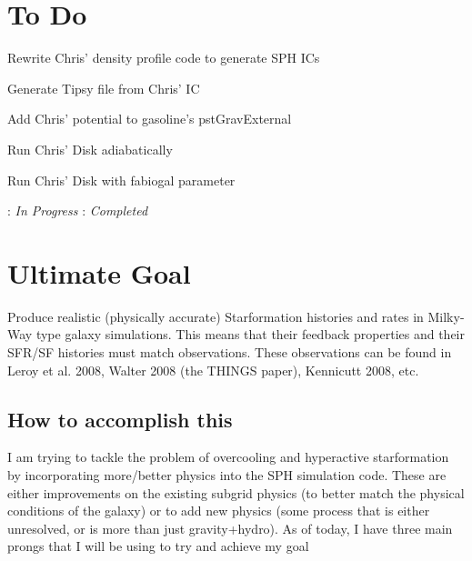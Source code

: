 \documentclass[11pt,letterpaper]{article}
\begin{document}
\section{To Do}
\begin{bullets}
\item[\checkmark] Rewrite Chris' density profile code to generate SPH ICs
\item[\checkmark] Generate Tipsy file from Chris' IC
\item Add Chris' potential to gasoline's pstGravExternal
\item Run Chris' Disk adiabatically
\item Run Chris' Disk with fabiogal parameter
\end{bullets}

\textleaf : \textit{In Progress} \qquad \checkmark : \textit{Completed}
\section{Ultimate Goal}

Produce realistic (physically accurate) Starformation histories and
rates in Milky-Way type galaxy simulations. This means that their
feedback properties and their SFR/SF histories must match observations.
These observations can be found in Leroy et al. 2008, Walter 2008 (the
THINGS paper), Kennicutt 2008, etc.

\subsection{How to accomplish this}

I am trying to tackle the problem of overcooling and hyperactive
starformation by incorporating more/better physics into the SPH
simulation code. These are either improvements on the existing subgrid
physics (to better match the physical conditions of the galaxy) or to
add new physics (some process that is either unresolved, or is more than
just gravity+hydro). As of today, I have three main prongs that I will
be using to try and achieve my goal
\end{document}
